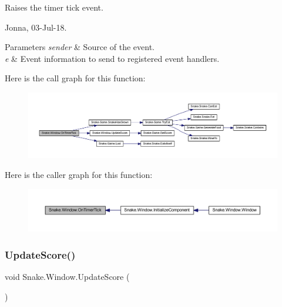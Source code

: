 Raises the timer tick event. 

Jonna, 03-\/\+Jul-\/18. 


\begin{DoxyParams}{Parameters}
{\em sender} & Source of the event. \\
\hline
{\em e} & Event information to send to registered event handlers. \\
\hline
\end{DoxyParams}
Here is the call graph for this function\+:
\nopagebreak
\begin{figure}[H]
\begin{center}
\leavevmode
\includegraphics[width=350pt]{d8/dae/class_snake_1_1_window_aea9a1f8d7553baa30e67b58909210415_cgraph}
\end{center}
\end{figure}
Here is the caller graph for this function\+:
\nopagebreak
\begin{figure}[H]
\begin{center}
\leavevmode
\includegraphics[width=350pt]{d8/dae/class_snake_1_1_window_aea9a1f8d7553baa30e67b58909210415_icgraph}
\end{center}
\end{figure}
\mbox{\label{class_snake_1_1_window_ad7ff8d320d8b689f6c4df5170f922030}} 
\subsubsection{\texorpdfstring{Update\+Score()}{UpdateScore()}}
{\footnotesize\ttfamily void Snake.\+Window.\+Update\+Score (\begin{DoxyParamCaption}{ }\end{DoxyParamCaption})\hspace{0.3cm}{\ttfamily [private]}}



